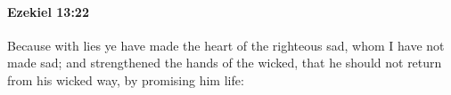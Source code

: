 
		\paragraph{Ezekiel 13:22} %
			\label{EZEKIEL-13-22}

			Because with lies ye have made the heart of the righteous sad, whom I have not made sad; and strengthened the hands of the wicked, that he should not return from his wicked way, by promising him life:


